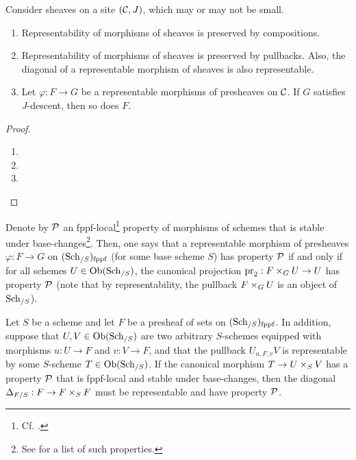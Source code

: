             \begin{lemma} \label{lemma: permanence_of_properties_of_representable_morphisms}
                Consider sheaves on a site $(\mathcal{C}, J)$, which may or may not be small.
                    \begin{enumerate}
                        \item Representability of morphisms of sheaves is preserved by compositions.
                        \item Representability of morphisms of sheaves is preserved by pullbacks. Also, the diagonal of a representable morphism of sheaves is also representable.
                        \item Let $\varphi: F \to G$ be a representable morphisms of presheaves on $\mathcal{C}$. If $G$ satisfies $J$-descent, then so does $F$.
                    \end{enumerate}
            \end{lemma}
                \begin{proof}
                    \noindent
                    \begin{enumerate}
                        \item 
                        \item 
                        \item 
                    \end{enumerate}
                \end{proof}
            \begin{definition} \label{def: properties_of_representable_morphisms_of_fppf_sheaves}
                Denote by $\mathcal{P}$ an fppf-local\footnote{Cf. \cite[\href{https://stacks.math.columbia.edu/tag/02KO}{Tag 02KO}]{stacks-project}.} property of morphisms of schemes that is stable under base-changes\footnote{See \cite[\href{https://stacks.math.columbia.edu/tag/02WE}{Tag 02WE}]{stacks-project} for a list of such properties.}. Then, one says that a representable morphism of presheaves $\varphi: F \to G$ on $(\mathrm{Sch}_{/S})_{\mathrm{fppf}}$ (for some base scheme $S$) has property $\mathcal{P}$ if and only if for all schemes $U \in \mathrm{Ob}(\mathrm{Sch}_{/S})$, the canonical projection $\pr_2: F \x_G U \to U$ has property $\mathcal{P}$ (note that by representability, the pullback $F \x_G U$ is an object of $\mathrm{Sch}_{/S}$).
            \end{definition}
            \begin{proposition} \label{prop: representability_criterion_for_diagonals}
                Let $S$ be a scheme and let $F$ be a presheaf of sets on $(\mathrm{Sch}_{/S})_{\mathrm{fppf}}$. In addition, suppose that $U, V \in \mathrm{Ob}(\mathrm{Sch}_{/S})$ are two arbitrary $S$-schemes equipped with morphisms $u: U \to F$ and $v: V \to F$, and that the pullback $U_{u, F, v} V$ is representable by some $S$-scheme $T \in \mathrm{Ob}(\mathrm{Sch}_{/S})$. If the canonical morphism $T \to U \x_S V$ has a property $\mathcal{P}$ that is fppf-local and stable under base-changes, then the diagonal $\Delta_{F/S}: F \to F \x_S F$ must be representable and have property $\mathcal{P}$.
            \end{proposition}
